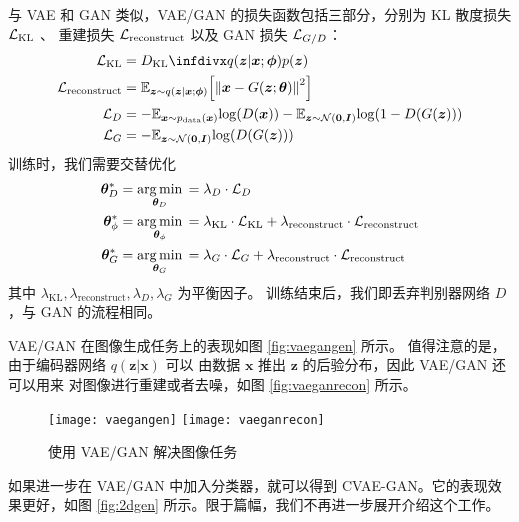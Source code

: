 与 VAE 和 GAN 类似，VAE/GAN 的损失函数包括三部分，分别为 KL 散度损失 $\mathcal{L}_{\text{KL}}$ 、 重建损失
$\mathcal{L}_{\text{reconstruct}}$ 以及 GAN 损失 $\mathcal{L}_{{G/D}}$：
\begin{subequations}
	\begin{align}
		\Loss_{\text{KL}}          & = \DKL{q(\bm z | \bm x; \bm\phi)}{p(\bm z)}
		\\
		\Loss_{\text{reconstruct}} & = \EXPECT{\bm z\sim q(\bm z | \bm x; \bm \phi)}{\left[\Norm*{\bm x - G(\bm z; \bm \theta)}^2\right]}
		\\
		\Loss_D                    & =
		- \EXPECT{\bm x \sim \PDATA(\bm x)}           \log(    D(\bm x))
		- \EXPECT{\bm z \sim \NormDist(\bm 0, \bm I)} \log(1 - D( G(\bm z)))
		\\
		\Loss_G                    & =
		- \EXPECT{\bm z \sim \NormDist(\bm 0, \bm I)} \log(D( G(\bm z)))
	\end{align}
	\label{eq:vaeganloss}
\end{subequations}
训练时，我们需要交替优化
\begin{subequations}
	\label{eq:vaegantrain}
	\begin{align}
		\bm\theta_D^*    & = \mathop{\arg\min}_{\bm\theta_D}\, = \lambda_D \cdot \mathcal{L}_D\label{eq:vaegantrain1}
		\\
		\bm\theta_\phi^* & = \mathop{\arg\min}_{\bm\theta_\phi}\, =
		\lambda_{\text{KL}} \cdot \mathcal{L}_{\text{KL}} +
		\lambda_{\text{reconstruct}} \cdot \mathcal{L}_{\text{reconstruct}}\label{eq:vaegantrain2}
		\\
		\bm\theta_G^*    & = \mathop{\arg\min}_{\bm\theta_G}\, =
		\lambda_G \cdot \mathcal{L}_G +
		\lambda_{\text{reconstruct}} \cdot \mathcal{L}_{\text{reconstruct}}\label{eq:vaegantrain3}
	\end{align}
\end{subequations}
其中 $\lambda_{\text{KL}}, \lambda_{\text{reconstruct}}, \lambda_D, \lambda_G$ 为平衡因子。
训练结束后，我们即丢弃判别器网络 $D$，与 GAN 的流程相同。


VAE/GAN 在图像生成任务上的表现如图 \ref{fig:vaegangen} 所示。
值得注意的是，由于编码器网络 $q(\bm z | \bm x)$ 可以
由数据 $\bm x$ 推出 $\bm z$ 的后验分布，因此 VAE/GAN 还可以用来
对图像进行重建或者去噪，如图  \ref{fig:vaeganrecon} 所示。
\begin{figure}[h]
	\centering%
	{\texttt{[image: vaegangen]}}%
	{\texttt{[image: vaeganrecon]}}
	\caption{使用 VAE/GAN 解决图像任务\cite{vaegan}}
\end{figure}

如果进一步在 VAE/GAN 中加入分类器，就可以得到 CVAE-GAN\cite{cvaegan}。它的表现效果更好，如图 \ref{fig:2dgen} 所示。限于篇幅，我们不再进一步展开介绍这个工作。


